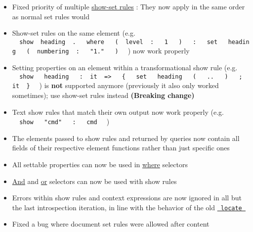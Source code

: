 \begin{itemize}
\tightlist
\item
  Fixed priority of multiple
  \href{/docs/reference/styling/\#show-rules}{show-set rules} : They now
  apply in the same order as normal set rules would
\item
  Show-set rules on the same element (e.g.
  \texttt{\ }{\texttt{\ show\ }}\texttt{\ heading\ }{\texttt{\ .\ }}\texttt{\ }{\texttt{\ where\ }}\texttt{\ }{\texttt{\ (\ }}\texttt{\ level\ }{\texttt{\ :\ }}\texttt{\ }{\texttt{\ 1\ }}\texttt{\ }{\texttt{\ )\ }}\texttt{\ }{\texttt{\ :\ }}\texttt{\ }{\texttt{\ set\ }}\texttt{\ }{\texttt{\ heading\ }}\texttt{\ }{\texttt{\ (\ }}\texttt{\ numbering\ }{\texttt{\ :\ }}\texttt{\ }{\texttt{\ "1."\ }}\texttt{\ }{\texttt{\ )\ }}\texttt{\ }
  ) now work properly
\item
  Setting properties on an element within a transformational show rule
  (e.g.
  \texttt{\ }{\texttt{\ show\ }}\texttt{\ }{\texttt{\ heading\ }}\texttt{\ }{\texttt{\ :\ }}\texttt{\ it\ }{\texttt{\ =\textgreater{}\ }}\texttt{\ }{\texttt{\ \{\ }}\texttt{\ }{\texttt{\ set\ }}\texttt{\ }{\texttt{\ heading\ }}\texttt{\ }{\texttt{\ (\ }}\texttt{\ }{\texttt{\ ..\ }}\texttt{\ }{\texttt{\ )\ }}\texttt{\ }{\texttt{\ ;\ }}\texttt{\ it\ }{\texttt{\ \}\ }}\texttt{\ }
  ) is \textbf{not} supported anymore (previously it also only worked
  sometimes); use show-set rules instead \textbf{(Breaking change)}
\item
  Text show rules that match their own output now work properly (e.g.
  \texttt{\ }{\texttt{\ show\ }}\texttt{\ }{\texttt{\ "cmd"\ }}\texttt{\ }{\texttt{\ :\ }}\texttt{\ }{\texttt{\ \textasciigrave{}cmd\textasciigrave{}\ }}\texttt{\ }
  )
\item
  The elements passed to show rules and returned by queries now contain
  all fields of their respective element functions rather than just
  specific ones
\item
  All settable properties can now be used in
  \href{/docs/reference/foundations/function/\#definitions-where}{where}
  selectors
\item
  \href{/docs/reference/foundations/selector/\#definitions-and}{And} and
  \href{/docs/reference/foundations/selector/\#definitions-or}{or}
  selectors can now be used with show rules
\item
  Errors within show rules and context expressions are now ignored in
  all but the last introspection iteration, in line with the behavior of
  the old
  \href{/docs/reference/introspection/locate/}{\texttt{\ locate\ }}
\item
  Fixed a bug where document set rules were allowed after content
\end{itemize}

